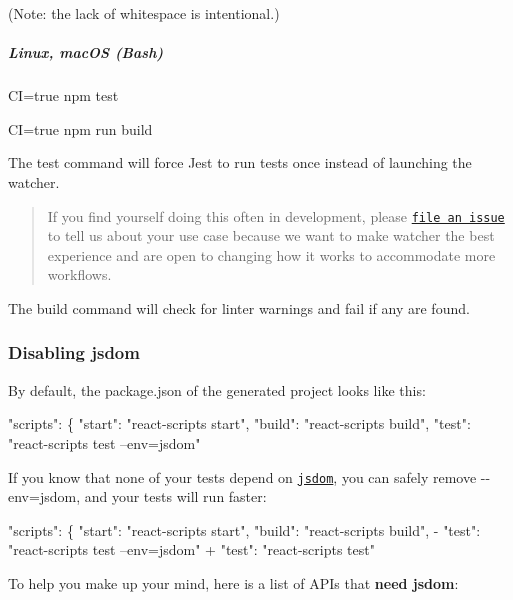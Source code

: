 (Note\+: the lack of whitespace is intentional.)

\subparagraph*{Linux, mac\+OS (Bash)}


\begin{DoxyCode}
CI=true npm test
\end{DoxyCode}



\begin{DoxyCode}
CI=true npm run build
\end{DoxyCode}


The test command will force Jest to run tests once instead of launching the watcher.

\begin{quote}
If you find yourself doing this often in development, please \href{https://github.com/facebookincubator/create-react-app/issues/new}{\tt file an issue} to tell us about your use case because we want to make watcher the best experience and are open to changing how it works to accommodate more workflows. \end{quote}


The build command will check for linter warnings and fail if any are found.

\subsubsection*{Disabling jsdom}

By default, the {\ttfamily package.\+json} of the generated project looks like this\+:


\begin{DoxyCode}
"scripts": \{
  "start": "react-scripts start",
  "build": "react-scripts build",
  "test": "react-scripts test --env=jsdom"
\end{DoxyCode}


If you know that none of your tests depend on \href{https://github.com/tmpvar/jsdom}{\tt jsdom}, you can safely remove {\ttfamily -\/-\/env=jsdom}, and your tests will run faster\+:


\begin{DoxyCode}
  "scripts": \{
    "start": "react-scripts start",
    "build": "react-scripts build",
-   "test": "react-scripts test --env=jsdom"
+   "test": "react-scripts test"
\end{DoxyCode}


To help you make up your mind, here is a list of A\+P\+Is that {\bfseries need jsdom}\+:


